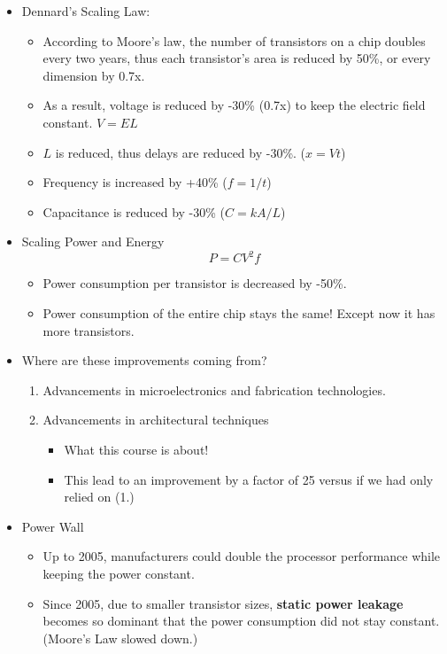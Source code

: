 \documentclass[10pt]{article}
\begin{document}
\begin{itemize}
    \item Dennard's Scaling Law:
    \begin{itemize}
        \item According to Moore's law, the number of transistors on a chip doubles every two years, thus each transistor's area is reduced by 50\%, or every dimension by 0.7x.
        \item As a result, voltage is reduced by -30\% (0.7x) to keep the electric field constant.  $V = EL$
        \item $L$ is reduced, thus delays are reduced by -30\%.  ($x = Vt$)
        \item Frequency is increased by +40\% ($f = 1 / t$)
        \item Capacitance is reduced by -30\% ($C = kA/L$)
    \end{itemize}
    \item Scaling Power and Energy
    \[P = CV^2f\]
    \begin{itemize}
        \item Power consumption per transistor is decreased by -50\%.
        \item Power consumption of the entire chip stays the same!  Except now it has more transistors.
    \end{itemize}
    \item Where are these improvements coming from?
    \begin{enumerate}
        \item Advancements in microelectronics and fabrication technologies.
        \item Advancements in architectural techniques
        \begin{itemize}
            \item What this course is about!
            \item This lead to an improvement by a factor of 25 versus if we had only relied on (1.)
        \end{itemize}
    \end{enumerate}
    \item Power Wall
    \begin{itemize}
        \item Up to 2005, manufacturers could double the processor performance while keeping the power constant.
        \item Since 2005, due to smaller transistor sizes, \textbf{static power leakage} becomes so dominant that the power consumption did not stay constant.  (Moore's Law slowed down.)

\end{itemize}
\end{itemize}
\end{document}
